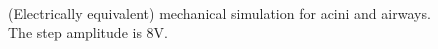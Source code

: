 \begin{figure}[h]\centering
  \\
  \caption{(Electrically equivalent) mechanical simulation for acini
    and airways.  The step amplitude is 8V.}
  \label{fig:mechanical_results_8}
\end{figure}

